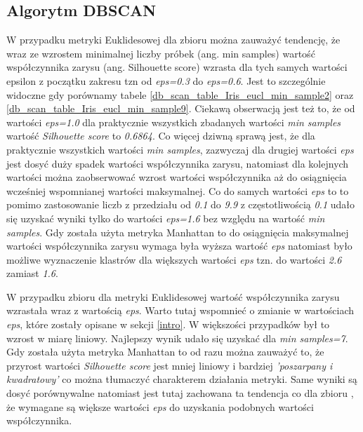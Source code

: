\documentclass{classrep}
\begin{document}
{        \subsection{Algorytm DBSCAN}
        \label{summary_4} {
            W przypadku metryki Euklidesowej dla zbioru \cite{dataset_iris} można
            zauważyć tendencję, że wraz ze wzrostem minimalnej liczby próbek
            (ang. min samples) wartość współczynnika zarysu (ang. Silhouette score)
            wzrasta dla tych samych wartości epsilon z początku zakresu tzn
            od \textit{eps=0.3} do \textit{eps=0.6}. Jest to szczególnie widoczne gdy
            porównamy tabele \ref{db_scan_table_Iris_eucl_min_sample2} oraz
            \ref{db_scan_table_Iris_eucl_min_sample9}. Ciekawą obserwacją jest też to,
            że od wartości \textit{eps=1.0} dla praktycznie wszystkich zbadanych
            wartości \textit{min samples} wartość \textit{Silhouette score}
            to \textit{0.6864}. Co więcej dziwną sprawą jest, że dla praktycznie
            wszystkich wartości \textit{min samples}, zazwyczaj dla drugiej wartości
            \textit{eps} jest dosyć duży spadek wartości współczynnika zarysu,
            natomiast dla kolejnych wartości można zaobserwować wzrost wartości
            współczynnika aż do osiągnięcia wcześniej wspomnianej wartości maksymalnej.
            Co do samych wartości \textit{eps} to to pomimo zastosowanie liczb z
            przedziału od \textit{0.1} do \textit{9.9} z częstotliwością \textit{0.1}
            udało się uzyskać wyniki tylko do wartości \textit{eps=1.6} bez względu na
            wartość \textit{min samples}. Gdy została użyta metryka Manhattan to do
            osiągnięcia maksymalnej wartości współczynnika zarysu wymaga była wyższa
            wartość \textit{eps} natomiast było możliwe wyznaczenie klastrów dla
            większych wartości \textit{eps} tzn. do wartości \textit{2.6} zamiast
            \textit{1.6}.

            W przypadku zbioru \cite{dataset_customers} dla metryki Euklidesowej
            wartość współczynnika zarysu wzrastała wraz z wartością \textit{eps}. Warto
            tutaj wspomnieć o zmianie w wartościach \textit{eps}, które zostały opisane
            w sekcji \ref{intro}.
            W większości przypadków był to wzrost w miarę liniowy. Najlepszy wynik udało
            się uzyskać dla \textit{min samples=7}. Gdy została użyta metryka Manhattan
            to od razu można zauważyć to, że przyrost wartości \textit{Silhouette score}
            jest mniej liniowy i bardziej \textit{'poszarpany i kwadratowy'} co można
            tłumaczyć charakterem działania metryki. Same wyniki są dosyć porównywalne
            natomiast jest tutaj zachowana ta tendencja co dla zbioru \cite{dataset_iris},
            że wymagane są większe wartości \textit{eps} do uzyskania podobnych
            wartości współczynnika.

}}
\end{document}
